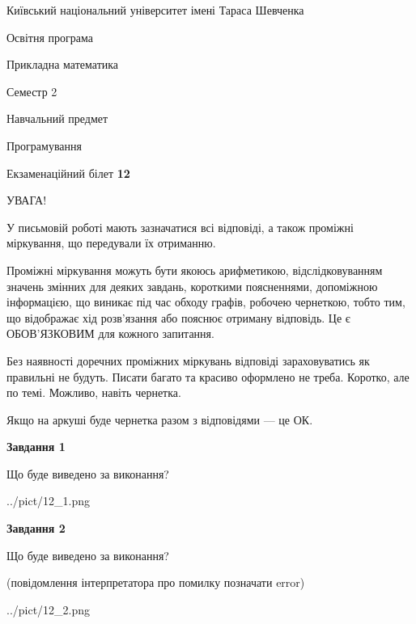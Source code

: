 \documentclass[12pt, ukrainian]{article}
\begin{document}
{{\begin {small}\par
{ \center  Київський національний університет імені Тараса Шевченка \par}
{\parbox {5 cm}{Освітня програма \hfill}{\parbox {7 cm}{Прикладна математика\hfill}}\parbox {6 cm}{\hfill Семестр 2}}\par
{\parbox {5 cm} {Навчальний предмет \hfill}\parbox {7 cm}{Програмування \hfill}\parbox {6cm}{\hfill}\par}\vspace{-7pt} \end{small}}{\center Екзаменаційний білет \No \textbf
{ 12 }\par}}
{
\begin {large}
УВАГА!

У письмовій роботі мають зазначатися всі відповіді, а також проміжні міркування, що передували їх отриманню.

Проміжні міркування можуть бути якоюсь арифметикою, відслідковуванням зна\-чень змінних для деяких завдань,
короткими поясненнями, допоміжною інформацією, що виникає під час обходу графів, робочею чернеткою,
тобто тим, що відображає хід розв’язання або пояснює отриману відповідь.
Це є ОБОВ’ЯЗКОВИМ для кожного запитання.

Без наявності доречних проміжних міркувань відповіді зараховуватись як правиль\-ні не будуть.
Писати багато та красиво оформлено не треба. Коротко, але по темі. Можли\-во, навіть чернетка.

Якщо на аркуші буде чернетка разом з відповідями --- це ОК.

\newpage

{\begin {center}\textbf{Завдання 1}\end {center}}\par
Що буде виведено за виконання?\par
\begin{center}
	{../pict/12_1.png}
\end{center}
\newpage

{\begin {center}\textbf{Завдання 2}\end {center}}\par
Що буде виведено за виконання?\par
 (повідомлення інтерпретатора про помилку позначати error)\par
\begin{center}
	{../pict/12_2.png}
\end{center}
\newpage


\end{large}}
\end{document}

